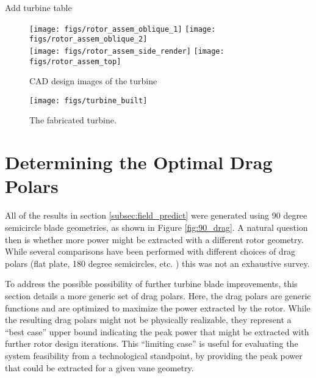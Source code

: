 Add turbine table

  \begin{figure}
   \centering
   \texttt{[image: figs/rotor\_assem\_oblique\_1]}
   \hfill
   \texttt{[image: figs/rotor\_assem\_oblique\_2]}
   \\
   \vspace{1em}
   \texttt{[image: figs/rotor\_assem\_side\_render]}
   \hfill
   \texttt{[image: figs/rotor\_assem\_top]}
   \\   
   \caption{CAD design images of the turbine} 
   \label{fig:cad_turbine}
  \end{figure}


  \begin{figure}
   \centering
   \texttt{[image: figs/turbine\_built]}
   \caption{The fabricated turbine.} 
   \label{fig:turbine_built}
  \end{figure}
  

\section{Determining the Optimal Drag Polars}

All of the results in section \ref{subsec:field_predict} were generated
using 90 degree semicircle blade geometries, as shown in Figure
\ref{fig:90_drag}. A natural question then is whether more power might
be extracted with a different rotor geometry. While several comparisons
have been performed with different choices of drag polars (flat plate,
180 degree semicircles, etc. ) this was not an exhaustive survey. 

To address the possible possibility of further turbine blade
improvements, this section details a more generic set of drag
polars. Here, the drag polars are generic functions and are optimized to
maximize the power extracted by the rotor. While the resulting drag
polars might not be physically  realizable, they represent a ``best
case'' upper bound indicating the peak power that might be extracted
with further rotor design iterations. This ``limiting case'' is useful
for evaluating the system feasibility from a technological standpoint,
by providing the peak power that could be extracted for a given vane
geometry. 

